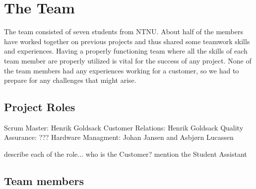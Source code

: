 \section{The Team}
The team consisted of seven students from NTNU. About half of the members have worked
together on previous projects and thus shared some teamwork skills and experiences.
Having a properly functioning team where all the skills of each team member are properly
utilized is vital for the success of any project. None of the team members had any experiences
working for a customer, so we had to prepare for any challenges that might arise.


\subsection{Project Roles}
Scrum Master: Henrik Goldsack\newline
Customer Relations: Henrik Goldsack\newline
Quality Assurance: ???\newline
Hardware Managment: Johan Jansen and Asbjørn Lucassen\newline

\todo 
{
describe each of the role... who is the Customer? mention the Student Assistant
}

\subsection{Team members}

